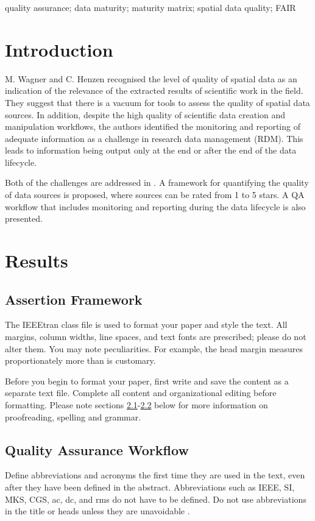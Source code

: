 \documentclass[conference]{IEEEtran}
\begin{document}
\begin{IEEEkeywords}
quality assurance; data maturity; maturity matrix; spatial data quality; FAIR
\end{IEEEkeywords}

\section{Introduction}
M. Wagner and C. Henzen recognised the level of quality of spatial data as an indication of the relevance of the extracted results of scientific work in the field. They suggest that there is a vacuum for tools to assess the quality of spatial data sources. In addition, despite the high quality of scientific data creation and manipulation workflows, the authors identified the monitoring and reporting of adequate information as a challenge in research data management (RDM). This leads to information being output only at the end or after the end of the data lifecycle.

Both of the challenges are addressed in \cite{wagner2022quality}. A framework for quantifying the quality of data sources is proposed, where sources can be rated from 1 to 5 stars. A QA workflow that includes monitoring and reporting during the data lifecycle is also presented.

\section{Results}

\subsection{Assertion Framework} \label{AF}

The IEEEtran class file is used to format your paper and style the text. All margins, 
column widths, line spaces, and text fonts are prescribed; please do not 
alter them. You may note peculiarities. For example, the head margin
measures proportionately more than is customary. 

Before you begin to format your paper, first write and save the content as a 
separate text file. Complete all content and organizational editing before 
formatting. Please note sections \ref{AF}-\ref{QAW} below for more information on 
proofreading, spelling and grammar.

\subsection{Quality Assurance Workflow}\label{QAW}
Define abbreviations and acronyms the first time they are used in the text, 
even after they have been defined in the abstract. Abbreviations such as 
IEEE, SI, MKS, CGS, ac, dc, and rms do not have to be defined. Do not use 
abbreviations in the title or heads unless they are unavoidable \cite{wagner2022quality}.
\end{document}
